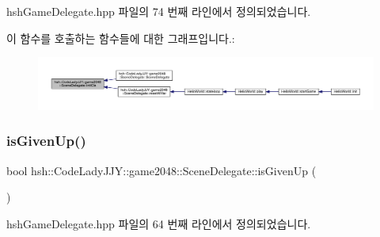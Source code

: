 hsh\+Game\+Delegate.\+hpp 파일의 74 번째 라인에서 정의되었습니다.

이 함수를 호출하는 함수들에 대한 그래프입니다.\+:
\nopagebreak
\begin{figure}[H]
\begin{center}
\leavevmode
\includegraphics[width=350pt]{classhsh_1_1_code_lady_j_j_y_1_1game2048_1_1_scene_delegate_ab5504cff24fa2c916c0c6139aff67a4e_icgraph}
\end{center}
\end{figure}
\mbox{\label{classhsh_1_1_code_lady_j_j_y_1_1game2048_1_1_scene_delegate_a66c164970bd5d826ca85deaeea30167b}} 
\subsubsection{\texorpdfstring{is\+Given\+Up()}{isGivenUp()}}
{\footnotesize\ttfamily bool hsh\+::\+Code\+Lady\+J\+J\+Y\+::game2048\+::\+Scene\+Delegate\+::is\+Given\+Up (\begin{DoxyParamCaption}{ }\end{DoxyParamCaption})\hspace{0.3cm}{\ttfamily [inline]}}



hsh\+Game\+Delegate.\+hpp 파일의 64 번째 라인에서 정의되었습니다.

